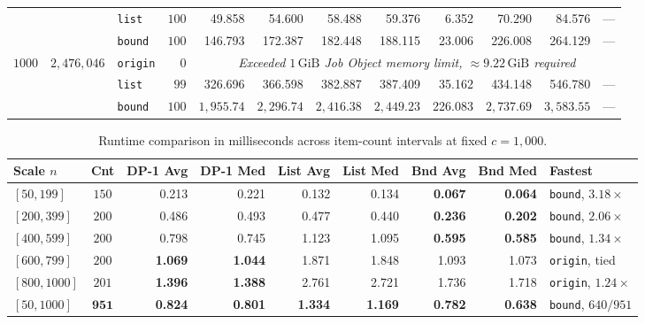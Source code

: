 \documentclass[10pt, a4paper]{article}
\newcommand{\code}[1]{\texttt{\color{primary!90!black}#1}}
\begin{document}
\begin{table}[H]
\begin{tabular}{@{}rrlrrrrrrrrr@{}}
& & \code{list}   & $100$ &  49.858 &  54.600 &  58.488 &  59.376 &  6.352 &  70.290 &  84.576 & --- \\
& & \code{bound}  & $100$ & 146.793 & 172.387 & 182.448 & 188.115 & 23.006 & 226.008 & 264.129 & --- \\
\midrule
\multirow{3}{*}{$1000$} & \multirow{3}{*}{$2{,}476{,}046$}
  & \code{origin} &   $0$ & \multicolumn{8}{c}{\color{textmuted}\itshape Exceeded $1\,\text{GiB}$ Job Object memory limit, $\approx 9.22\,\text{GiB}$ required} \\
& & \code{list}   &  $99$ & 326.696 & 366.598 & 382.887 & 387.409 & 35.162 & 434.148 & 546.780 & --- \\
& & \code{bound}  & $100$ & $1{,}955.74$ & $2{,}296.74$ & $2{,}416.38$ & $2{,}449.23$ & 226.083 & $2{,}737.69$ & $3{,}583.55$ & --- \\
\bottomrule
\end{tabular}
\end{table}
\vspace{-0.3em}

\vspace{-0.2em}
\begin{table}[H]
\centering
\caption{Runtime comparison in milliseconds across item-count intervals at fixed $c = 1{,}000$.}
\label{tab:c1000}
\renewcommand{\arraystretch}{0.95}
\setlength{\tabcolsep}{3.4pt}
\footnotesize
\begin{tabular}{@{}lcrrrrrrl@{}}
\toprule
\textbf{\color{primary}Scale $n$} & \textbf{\color{primary}Cnt} & \textbf{\color{primary}DP-1 Avg} & \textbf{\color{primary}DP-1 Med} & \textbf{\color{primary}List Avg} & \textbf{\color{primary}List Med} & \textbf{\color{primary}Bnd Avg} & \textbf{\color{primary}Bnd Med} & \textbf{\color{primary}Fastest} \\
\midrule
$[50, 199]$   & $150$ & 0.213 & 0.221 & 0.132 & 0.134 & \textbf{0.067} & \textbf{0.064} & \code{bound}, $3.18\times$ \\
$[200, 399]$  & $200$ & 0.486 & 0.493 & 0.477 & 0.440 & \textbf{0.236} & \textbf{0.202} & \code{bound}, $2.06\times$ \\
$[400, 599]$  & $200$ & 0.798 & 0.745 & 1.123 & 1.095 & \textbf{0.595} & \textbf{0.585} & \code{bound}, $1.34\times$ \\
$[600, 799]$  & $200$ & \textbf{1.069} & \textbf{1.044} & 1.871 & 1.848 & 1.093 & 1.073 & \code{origin}, tied \\
$[800, 1000]$ & $201$ & \textbf{1.396} & \textbf{1.388} & 2.761 & 2.721 & 1.736 & 1.718 & \code{origin}, $1.24\times$ \\
\midrule
\textbf{$[50, 1000]$} & $\mathbf{951}$ & \textbf{0.824} & \textbf{0.801} & \textbf{1.334} & \textbf{1.169} & \textbf{0.782} & \textbf{0.638} & \code{bound}, $640/951$ \\
\bottomrule
\end{tabular}
\end{table}
\vspace{-0.3em}
\end{document}
